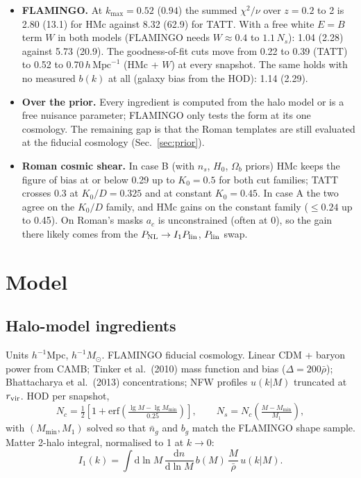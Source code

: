 \documentclass[11pt]{article}
\newcommand{\hmpc}{\,h\,\mathrm{Mpc}^{-1}}
\newcommand{\kmax}{k_{\max}}
\newcommand{\PNL}{P_{\rm NL}}
\newcommand{\Plin}{P_{\rm lin}}
\newcommand{\dd}{\mathrm{d}}
\begin{document}
\begin{itemize}[itemsep=3pt]
  centrals' GI on $\PNL$, which implicitly assumes each central is perfectly
  aligned with the matter of its own halo. FLAMINGO's $P_{hE}$ lies 20 to 40\%
  below $b(k)\,$TATT($\PNL$) at $k = 0.5$ to 1.3$\hmpc$. Splitting the term into a
  2-halo piece on $I_1\Plin$ and a central 1-halo piece with a free alignment
  strength removes that residual.
\item \textbf{FLAMINGO.} At $\kmax = 0.52$ ($0.94$) the summed $\chi^2/\nu$ over
  $z = 0.2$ to 2 is 2.80 (13.1) for HMc against 8.32 (62.9) for TATT. With a free
  white $E = B$ term $W$ in both models (FLAMINGO needs $W \approx 0.4$ to $1.1\,N_s$):
  1.04 (2.28) against 5.73 (20.9). The goodness-of-fit cuts move from
  0.22 to 0.39 (TATT) to 0.52 to 0.70$\hmpc$ (HMc + $W$) at every snapshot.
  The same holds with no measured $b(k)$ at all (galaxy bias from the HOD):
  1.14 (2.29).
\item \textbf{Over the prior.} Every ingredient is computed from the halo model
  or is a free nuisance parameter; FLAMINGO only tests the form at its one
  cosmology. The remaining gap is that the Roman templates are still evaluated at
  the fiducial cosmology (Sec.~\ref{sec:prior}).
\item \textbf{Roman cosmic shear.} In case B (with $n_s$, $H_0$, $\Omega_b$ priors)
  HMc keeps the figure of bias at or below 0.29 up to $K_0 = 0.5$ for both
  cut families; TATT crosses 0.3 at $K_0/D = 0.325$ and at constant $K_0 = 0.45$.
  In case A the two agree on the $K_0/D$ family, and HMc gains on the
  constant family ($\le 0.24$ up to 0.45). On Roman's masks $a_c$ is unconstrained
  (often at 0), so the gain there likely comes from the $\PNL \to I_1\Plin$, $\Plin$ swap.
\end{itemize}

\section{Model}
\subsection{Halo-model ingredients}
Units $h^{-1}$Mpc, $h^{-1}M_\odot$. FLAMINGO fiducial cosmology. Linear
CDM + baryon power from CAMB; Tinker et al.\ (2010) mass function and bias
($\Delta = 200\bar\rho$); Bhattacharya et al.\ (2013) concentrations; NFW
profiles $u(k|M)$ truncated at $r_{\rm vir}$. HOD per snapshot,
\begin{equation}
N_c = \tfrac12\left[1 + \mathrm{erf}\!\left(\tfrac{\lg M - \lg M_{\min}}{0.25}\right)\right],\qquad
N_s = N_c\left(\tfrac{M - M_{\min}}{M_1}\right),
\end{equation}
with $(M_{\min}, M_1)$ solved so that $\bar n_g$ and $b_g$ match the FLAMINGO
shape sample. Matter 2-halo integral, normalised to 1 at $k \to 0$:
\begin{equation}
I_1(k) = \int \dd\ln M\,\frac{\dd n}{\dd\ln M}\, b(M)\,\frac{M}{\bar\rho}\,u(k|M).
\end{equation}
\end{document}
